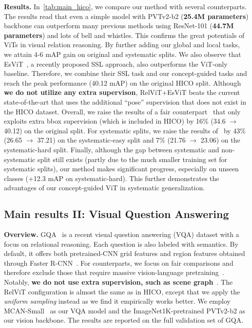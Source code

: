 \documentclass{article} \usepackage{iclr2022_conference,times}
\renewcommand{\paragraph}[1]{\noindent\textbf{#1.}}
\begin{document}
\paragraph{Results} In~\autoref{tab:main_hico}, we compare our method with several counterparts. The results read that even a simple model with PVTv2-b2 (\textbf{25.4M parameters}) backbone can outperform many previous methods using ResNet-101 (\textbf{44.7M parameters}) and lots of bell and whistles. This confirms the great potentials of ViTs in visual relation reasoning. By further adding our global and local tasks, we attain 4-6 mAP gain on original and systematic splits. We also observe that EsViT~\citep{esvit}, a recently proposed SSL approach, also outperforms the ViT-only baseline. Therefore, we combine their SSL task and our concept-guided tasks and reach the peak performance (40.12 mAP) on the original HICO split. Although \textbf{we do not utilize any extra supervison}, RelViT+EsViT beats the current state-of-the-art \cite{fang2018pairwise} that uses the additional ``pose'' supervision that does not exist in the HICO dataset.
Overall, we raise the results of a fair counterpart~\citep{girdhar2017attentional} that only exploits extra bbox supervision (which is included in HICO) by 16\% (34.6 $\rightarrow$ 40.12) on the original split. For systematic splits, we raise the results of~\cite{vcl} by 43\% (26.65 $\rightarrow$ 37.21) on the systematic-easy split and 7\% (21.76 $\rightarrow$ 23.06) on the systematic-hard split.
Finally, although the gap between systematic and non-systematic split still exists (partly due to the much smaller training set for systematic splits), our method makes significant progress, especially on unseen classes (+12.3 mAP on systematic-hard). This further demonstrates the advantages of our concept-guided ViT in systematic generalization.  

\vspace{-0.1in}
\subsection{Main results II: Visual Question Answering}
\vspace{-0.05in}
\label{sec:exp_vqa}

\paragraph{Overview} GQA~\citep{gqa} is a recent visual question answering (VQA) dataset with a focus on relational reasoning. Each question is also labeled with semantics. By default, it offers both pretrained-CNN grid features and region features obtained through Faster R-CNN~\citep{frcnn}. For counterparts, we focus on fair comparisons and therefore exclude those that require massive vision-language pretraining~\citep{li2019visualbert}. Notably, \textbf{we do not use extra supervision, such as scene graph}~\citep{vg}. The RelViT configuration is almost the same as in HICO, except that we apply the \emph{uniform sampling} instead as we find it empirically works better. We employ MCAN-Small~\citep{mcan} as our VQA model and the ImageNet1K-pretrained PVTv2-b2 as our vision backbone.
The results are reported on the full validation set of GQA.
\end{document}
